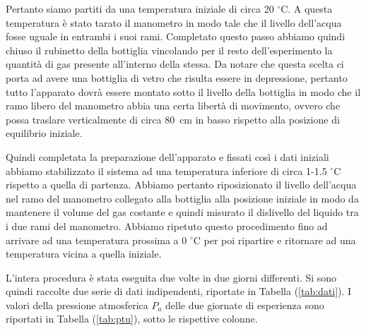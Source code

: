 Pertanto siamo partiti da una temperatura iniziale di circa 20 $^\circ$C. A questa temperatura è stato tarato il manometro in modo tale che il livello dell'acqua fosse uguale in entrambi i suoi rami. Completato questo passo abbiamo quindi chiuso il rubinetto della bottiglia vincolando per il resto dell'esperimento la quantità di gas presente all'interno della stessa. Da notare che questa scelta ci porta ad avere una bottiglia di vetro che risulta essere in depressione, pertanto tutto l'apparato dovrà essere montato sotto il livello della bottiglia in modo che il ramo libero del manometro abbia una certa libertà di movimento, ovvero che possa traslare verticalmente di circa \SI{80}{\centi\metre} in basso rispetto alla posizione di equilibrio iniziale.

Quindi completata la preparazione dell'apparato e fissati così i dati iniziali abbiamo stabilizzato il sistema ad una temperatura inferiore di circa 1-1.5 $^\circ$C rispetto a quella di partenza. Abbiamo pertanto riposizionato il livello dell'acqua nel ramo del manometro collegato alla bottiglia alla posizione iniziale in modo da mantenere il volume del gas costante e quindi misurato il dislivello del liquido tra i due rami del manometro.
Abbiamo ripetuto questo procedimento fino ad arrivare ad una temperatura prossima a 0 $^\circ$C per poi ripartire e ritornare ad una temperatura vicina a quella iniziale.

L'intera procedura è stata eseguita due volte in due giorni differenti. Si sono quindi raccolte due serie di dati indipendenti, riportate
in Tabella (\ref{tab:dati}). I valori della pressione atmosferica $P_a$ delle due giornate di esperienza sono
riportati in Tabella (\ref{tab:ptu}), sotto le rispettive colonne.

